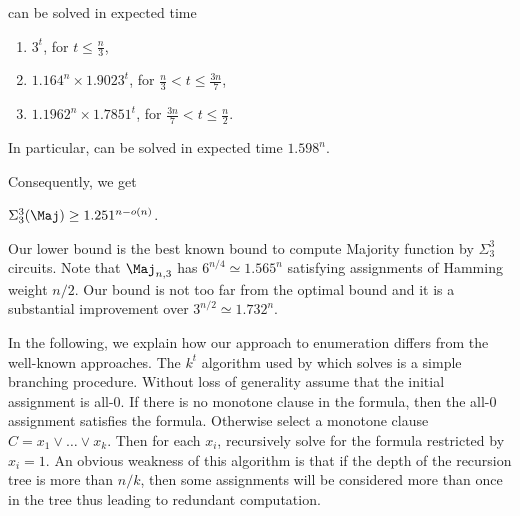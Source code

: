 \begin{theorem}
\label{thm:main-result}
 can be solved in expected time

\begin{enumerate}
	\item $3^t$, for $t \le \frac{n}{3}$,
	\item $1.164^n \times 1.9023^t$, for $\frac{n}{3} < t \le \frac{3n}{7}$,
	\item $1.1962^n \times 1.7851^t$, for $\frac{3n}{7} < t \le \frac{n}{2}$.
\end{enumerate}

In particular,  can be solved in expected time $1.598^n$. 
\end{theorem}

Consequently, we get
\begin{corollary}
$\Sigma^3_3(\Maj) \ge 1.251^{n - o(n)}$.
\end{corollary}

Our lower bound is the best known bound
to compute Majority function by $\Sigma^3_3$ circuits.
Note that $\Maj_{n, 3}$ has $6^{n/4} \simeq 1.565^n$ satisfying assignments of Hamming weight $n/2$. Our bound is not too far from the optimal bound 
and it is a substantial improvement over $3^{n/2} \simeq 1.732^n$.

In the following, we explain how our approach to enumeration differs 
from the well-known approaches.
The $k^t$ algorithm used by \cite{DantsinGHKKPRS02} which 
solves  is a simple branching procedure. Without 
loss of generality assume that the initial assignment is all-0. If 
there is no monotone clause in the formula, 
then the all-0 assignment satisfies the formula. 
Otherwise select a monotone clause $C = x_1 \vee \ldots \vee x_k$. 
Then for each $x_i$, recursively solve  
for the formula restricted by $x_i = 1$. 
An obvious weakness of this algorithm is that 
if the depth of the recursion tree is more than $n/k$, 
then some assignments will be considered more than once in 
the tree thus leading to redundant computation.

